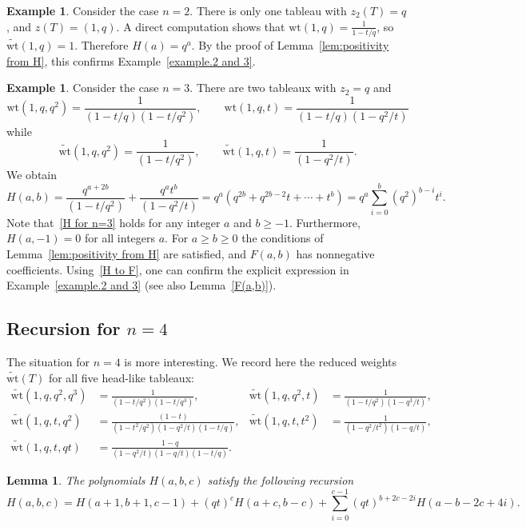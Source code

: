\documentclass[11pt,reqno]{amsart}
\newcommand{\wt}{\mathrm{wt}}
\newcommand{\twt}{\widetilde{\wt}}
\newtheorem{lemma}[theorem]{Lemma}
\theoremstyle{definition}
\newtheorem{example}[theorem]{Example}
\numberwithin{equation}{section}
\begin{document}
\begin{example}
\label{example.n=2}
Consider the case $n=2$. There is only one tableau with $z_2(T)=q$, and $z(T)=(1,q)$. A direct computation shows 
that $\wt(1,q)=\frac{1}{1-t/q}$, so $\twt(1,q)=1$. Therefore $H(a)=q^{a}$. By the proof of 
Lemma~\ref{lem:positivity from H}, this confirms Example~\ref{example.2 and 3}.
\end{example}

\begin{example}
\label{example.n=3}
Consider the case $n=3$. There are two tableaux with $z_2=q$ and
$$
	\wt(1,q,q^2)=\frac{1}{(1-t/q)(1-t/q^2)}, \qquad \wt(1,q,t)=\frac{1}{(1-t/q)(1-q^2/t)}
$$
while 
$$
	\twt(1,q,q^2)=\frac{1}{(1-t/q^2)}, \qquad \twt(1,q,t)=\frac{1}{(1-q^2/t)}.
$$
We obtain
\begin{equation}
\label{H for n=3}
	H(a,b)=\frac{q^{a+2b}}{(1-t/q^2)}+\frac{q^{a}t^{b}}{(1-q^2/t)}=q^a(q^{2b}+q^{2b-2}t+\cdots+t^b)
	=q^a \sum_{i=0}^b (q^2)^{b-i}t^i.
\end{equation}
Note that~\eqref{H for n=3} holds for any integer $a$ and $b\geqslant -1$. Furthermore, $H(a,-1)=0$ for all integers $a$.
For $a\geqslant b\geqslant 0$ the conditions of Lemma~\ref{lem:positivity from H} are satisfied, and $F(a,b)$ has 
nonnegative coefficients. Using~\eqref{H to F}, one can confirm the explicit expression in Example~\ref{example.2 and 3}
(see also Lemma~\ref{F(a,b)}).
\end{example}

\subsection{Recursion for $n=4$}
\label{subsec:recursion n=4}

The situation for $n=4$ is more interesting. We record here the reduced weights $\twt(T)$ for all five head-like tableaux:
\begin{align*}
	\twt(1,q,q^2,q^3)& =\frac{1}{(1-t/q^2)(1-t/q^3)}, & \twt(1,q,q^2,t)&=\frac{1}{(1-t/q^2)(1-q^3/t)},\\
	\twt(1,q,t,q^2)&=\frac{(1-t)}{(1-t^2/q^2)(1-q^2/t)(1-t/q)}, & \twt(1,q,t,t^2)&=\frac{1}{(1-q^2/t^2)(1-q/t)},\\
	\twt(1,q,t,qt)& =\frac{1-q}{(1-q^2/t)(1-q/t)(1-t/q)}. &&
\end{align*}

\begin{lemma}
The polynomials $H(a,b,c)$ satisfy the following recursion
$$
	H(a,b,c)=H(a+1,b+1,c-1)+(qt)^cH(a+c,b-c)+\sum_{i=0}^{c-1}(qt)^{b+2c-2i}H(a-b-2c+4i).
$$
\end{lemma}
\end{document}
